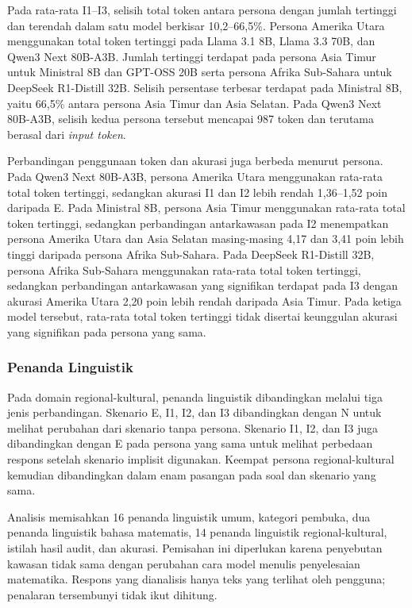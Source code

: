 Pada rata-rata I1--I3, selisih total token antara persona dengan jumlah
tertinggi dan terendah dalam satu model berkisar 10,2--66,5\%. Persona Amerika
Utara menggunakan total token tertinggi pada Llama 3.1 8B, Llama 3.3 70B, dan
Qwen3 Next 80B-A3B. Jumlah tertinggi terdapat pada persona Asia Timur untuk
Ministral 8B dan GPT-OSS 20B serta persona Afrika Sub-Sahara untuk DeepSeek
R1-Distill 32B. Selisih persentase terbesar terdapat pada Ministral 8B, yaitu
66,5\% antara persona Asia Timur dan Asia Selatan. Pada Qwen3 Next 80B-A3B,
selisih kedua persona tersebut mencapai 987 token dan terutama berasal dari
\textit{input token}.

Perbandingan penggunaan token dan akurasi juga berbeda menurut persona. Pada Qwen3
Next 80B-A3B, persona Amerika Utara menggunakan
rata-rata total token tertinggi, sedangkan akurasi I1 dan I2 lebih rendah
1,36--1,52 poin daripada E. Pada Ministral 8B, persona Asia Timur menggunakan
rata-rata total token tertinggi, sedangkan perbandingan antarkawasan pada I2
menempatkan persona Amerika Utara dan Asia Selatan masing-masing 4,17 dan 3,41
poin lebih tinggi daripada persona Afrika Sub-Sahara. Pada DeepSeek R1-Distill
32B, persona Afrika Sub-Sahara menggunakan
rata-rata total token tertinggi, sedangkan perbandingan antarkawasan yang signifikan
terdapat pada I3 dengan akurasi Amerika Utara 2,20 poin lebih rendah daripada
Asia Timur. Pada ketiga model tersebut, rata-rata total token tertinggi tidak
disertai keunggulan akurasi yang signifikan pada persona yang sama.

\subsubsection{Penanda Linguistik}
\label{subsubsec:penanda-regional-gsm8k}

Pada domain regional-kultural, penanda linguistik dibandingkan melalui tiga
jenis perbandingan. Skenario E, I1, I2, dan I3 dibandingkan dengan N untuk
melihat perubahan dari skenario tanpa persona. Skenario I1, I2, dan I3 juga
dibandingkan dengan E pada persona yang sama untuk melihat perbedaan respons
setelah skenario implisit digunakan. Keempat persona regional-kultural
kemudian dibandingkan dalam enam pasangan pada soal dan skenario yang sama.

Analisis memisahkan 16 penanda linguistik umum, kategori pembuka, dua penanda
linguistik bahasa matematis, 14 penanda linguistik regional-kultural, istilah
hasil audit, dan akurasi.
Pemisahan ini diperlukan karena penyebutan kawasan tidak sama dengan perubahan
cara model menulis penyelesaian matematika. Respons yang dianalisis hanya teks
yang terlihat oleh pengguna; penalaran tersembunyi tidak ikut dihitung.

